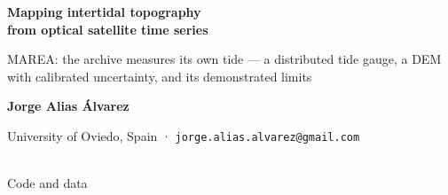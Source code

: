 %
\vspace*{-14mm}%
\begin{minipage}[c]{0.145\textwidth}
  \color{white}
  \setlength{\fboxrule}{1pt}%
  \textcolor{white}{}
\end{minipage}\hfill
\begin{minipage}[c]{0.70\textwidth}
  \color{white}\raggedright
  {\fontsize{78}{88}\selectfont\bfseries Mapping intertidal topography\\ from optical satellite time series\par}
  \vspace{7mm}
  {\fontsize{34}{42}\selectfont MAREA: the archive measures its own tide --- a distributed tide
   gauge, a DEM with calibrated uncertainty, and its demonstrated limits\par}
  \vspace{9mm}
  {\fontsize{30}{38}\selectfont
   \textbf{Jorge Alias \'Alvarez}\par}
  \vspace{2mm}
  {\fontsize{25}{32}\selectfont\color{PMist}
   University of Oviedo, Spain \quad·\quad
   \texttt{jorge.alias.alvarez@gmail.com}\par}
\end{minipage}\hfill
\begin{minipage}[c]{0.115\textwidth}
  \centering\color{white}
  \colorbox{white}{}\\[3mm]
  {\small Code and data}
\end{minipage}
\par\vspace{20mm}
